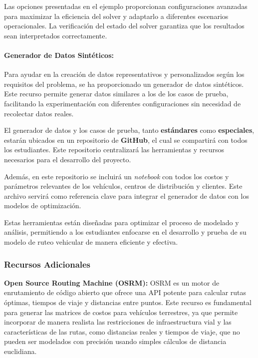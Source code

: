 \documentclass[12pt]{article}
\begin{document}
Las opciones presentadas en el ejemplo proporcionan configuraciones avanzadas para maximizar la eficiencia del solver y adaptarlo a diferentes escenarios operacionales. La verificación del estado del solver garantiza que los resultados sean interpretados correctamente.

\paragraph{Generador de Datos Sintéticos:}

Para ayudar en la creación de datos representativos y personalizados según los requisitos del problema, se ha proporcionado un generador de datos sintéticos. Este recurso permite generar datos similares a los de los casos de prueba, facilitando la experimentación con diferentes configuraciones sin necesidad de recolectar datos reales. 

El generador de datos y los casos de prueba, tanto \textbf{estándares} como \textbf{especiales}, estarán ubicados en un repositorio de \textbf{GitHub}, el cual se compartirá con todos los estudiantes. Este repositorio centralizará las herramientas y recursos necesarios para el desarrollo del proyecto.

Además, en este repositorio se incluirá un \textit{notebook} con todos los costos y parámetros relevantes de los vehículos, centros de distribución y clientes. Este archivo servirá como referencia clave para integrar el generador de datos con los modelos de optimización.

Estas herramientas están diseñadas para optimizar el proceso de modelado y análisis, permitiendo a los estudiantes enfocarse en el desarrollo y prueba de su modelo de ruteo vehicular de manera eficiente y efectiva.

\subsubsection{Recursos Adicionales}

\textbf{Open Source Routing Machine (OSRM):}  
OSRM es un motor de enrutamiento de código abierto que ofrece una API potente para calcular rutas óptimas, tiempos de viaje y distancias entre puntos. Este recurso es fundamental para generar las matrices de costos para vehículos terrestres, ya que permite incorporar de manera realista las restricciones de infraestructura vial y las características de las rutas, como distancias reales y tiempos de viaje, que no pueden ser modelados con precisión usando simples cálculos de distancia euclidiana.
\end{document}
